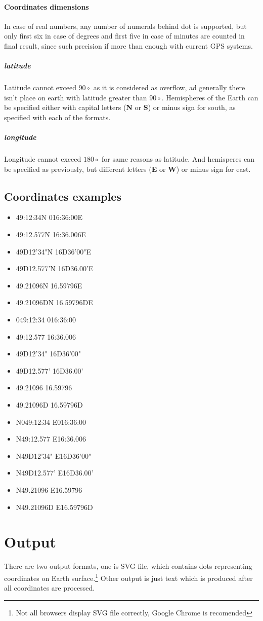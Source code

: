 \documentclass[12pt,titlepage]{article}
\begin{document}
\paragraph{Coordinates dimensions}
In case of real numbers, any number of numerals behind 
dot is supported, but only first six in case of degrees and first five in case of minutes are
counted in final result, since such precision if more than enough with current GPS systems. 

\subparagraph{latitude}
Latitude cannot exceed $90\circ$ as it is considered as overflow, ad generally there isn't place 
on earth with latitude greater than $90\circ$. Hemispheres of the Earth can be specified either with capital letters (\textbf{N} or \textbf{S}) or minus sign for south, as specified with each of the formats.
\subparagraph{longitude}
Longitude cannot exceed $180\circ$ for same reasons as latitude. And hemisperes can be specified 
as previously, but different letters (\textbf{E} or \textbf{W}) or minus sign for east. 

\subsection{Coordinates examples}
\begin{itemize}
\item{49:12:34N 016:36:00E }
\item{49:12.577N 16:36.006E}
\item{49D12'34"N 16D36'00"E}
\item{49D12.577'N 16D36.00'E}
\item{49.21096N 16.59796E}
\item{49.21096DN 16.59796DE}
 
\item{049:12:34 016:36:00 }
\item{49:12.577 16:36.006}
\item{49D12'34" 16D36'00"}
\item{49D12.577' 16D36.00'}
\item{49.21096 16.59796}
\item{49.21096D 16.59796D}

\item{N049:12:34 E016:36:00 }
\item{N49:12.577 E16:36.006}
\item{N49D12'34" E16D36'00"}
\item{N49D12.577' E16D36.00'}
\item{N49.21096 E16.59796}
\item{N49.21096D E16.59796D}
\end{itemize}

\section{Output}
There are two output formats, one is SVG file, which contains dots representing coordinates on Earth surface.\footnote{Not all browsers display SVG file correctly, Google Chrome is recomended} Other output is just text which is produced after all coordinates are processed. 
\end{document}
